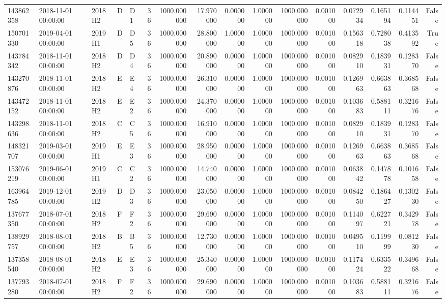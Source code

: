 \begin{tabular}{lllllrrrrrrrrrrr}
143862358 & 2018-11-01 00:00:00 & 2018H2 & D & D1 & 36 & 1000.000000 & 17.970000 & 0.000000 & 1.000000 & 1000.000000 & 0.001000 & 0.072934 & 0.165194 & 0.114451 & False \\
150701330 & 2019-04-01 00:00:00 & 2019H1 & D & D5 & 36 & 1000.000000 & 28.800000 & 1.000000 & 1.000000 & 1000.000000 & 0.001000 & 0.156318 & 0.728038 & 0.413592 & True \\
143784342 & 2018-11-01 00:00:00 & 2018H2 & D & D4 & 36 & 1000.000000 & 20.890000 & 0.000000 & 1.000000 & 1000.000000 & 0.001000 & 0.082910 & 0.183931 & 0.128370 & False \\
143270876 & 2018-11-01 00:00:00 & 2018H2 & E & E4 & 36 & 1000.000000 & 26.310000 & 0.000000 & 1.000000 & 1000.000000 & 0.001000 & 0.126963 & 0.663863 & 0.368568 & False \\
143472152 & 2018-11-01 00:00:00 & 2018H2 & E & E2 & 36 & 1000.000000 & 24.370000 & 0.000000 & 1.000000 & 1000.000000 & 0.001000 & 0.103683 & 0.588111 & 0.321676 & False \\
143298636 & 2018-11-01 00:00:00 & 2018H2 & C & C5 & 36 & 1000.000000 & 16.910000 & 0.000000 & 1.000000 & 1000.000000 & 0.001000 & 0.082910 & 0.183931 & 0.128370 & False \\
148321707 & 2019-03-01 00:00:00 & 2019H1 & E & E3 & 36 & 1000.000000 & 28.950000 & 0.000000 & 1.000000 & 1000.000000 & 0.001000 & 0.126963 & 0.663863 & 0.368568 & False \\
153076219 & 2019-06-01 00:00:00 & 2019H1 & C & C2 & 36 & 1000.000000 & 14.740000 & 0.000000 & 1.000000 & 1000.000000 & 0.001000 & 0.063842 & 0.147878 & 0.101658 & False \\
163964785 & 2019-12-01 00:00:00 & 2019H2 & D & D3 & 36 & 1000.000000 & 23.050000 & 0.000000 & 1.000000 & 1000.000000 & 0.001000 & 0.084250 & 0.186427 & 0.130230 & False \\
137677350 & 2018-07-01 00:00:00 & 2018H2 & F & F2 & 36 & 1000.000000 & 29.690000 & 0.000000 & 1.000000 & 1000.000000 & 0.001000 & 0.114097 & 0.622721 & 0.342978 & False \\
138929757 & 2018-08-01 00:00:00 & 2018H2 & B & B5 & 36 & 1000.000000 & 12.730000 & 0.000000 & 1.000000 & 1000.000000 & 0.001000 & 0.049510 & 0.119999 & 0.081230 & False \\
137358540 & 2018-08-01 00:00:00 & 2018H2 & E & E3 & 36 & 1000.000000 & 25.340000 & 0.000000 & 1.000000 & 1000.000000 & 0.001000 & 0.117424 & 0.633522 & 0.349668 & False \\
137793280 & 2018-07-01 00:00:00 & 2018H2 & F & F2 & 36 & 1000.000000 & 29.690000 & 0.000000 & 1.000000 & 1000.000000 & 0.001000 & 0.103683 & 0.588111 & 0.321676 & False \\

\end{tabular}

